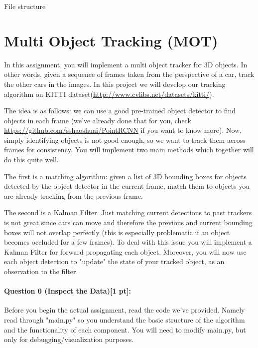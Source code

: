 \documentclass[11pt]{article}
\begin{document}
File structure

\section*{Multi Object Tracking (MOT)} 

In this assignment, you will implement a multi object tracker for 3D objects. In other words, given a sequence of frames taken from the perspective of a car, track the other cars in the images. In this project we will develop our tracking algorithm on KITTI dataset(\url{http://www.cvlibs.net/datasets/kitti/}). 

The idea is as follows: we can use a good pre-trained object detector to find objects in each frame (we've already done that for you, check \url{https://github.com/sshaoshuai/PointRCNN} if you want to know more). Now, simply identifying objects is not good enough, so we want to track them across frames for consistency. You will implement two main methods which together will do this quite well. 

The first is a matching algorithm: given a list of 3D bounding boxes for objects detected by the object detector in the current frame, match them to objects you are already tracking from the previous frame. 

The second is a Kalman Filter. Just matching current detections to past trackers is not great since cars can move and therefore the previous and current bounding boxes will not overlap perfectly (this is especially problematic if an object becomes occluded for a few frames). To deal with this issue you will implement a Kalman Filter for forward propagating each object. Moreover, you will now use each object detection to "update" the state of your tracked object, as an observation to the filter.

\paragraph{Question 0 (Inspect the Data)[1 pt]:}
Before you begin the actual assignment, read the code we've provided. Namely read through "main.py" so you understand the basic structure of the algorithm and the functionality of each component. You will need to modify main.py, but only for debugging/visualization purposes. 
\end{document}
